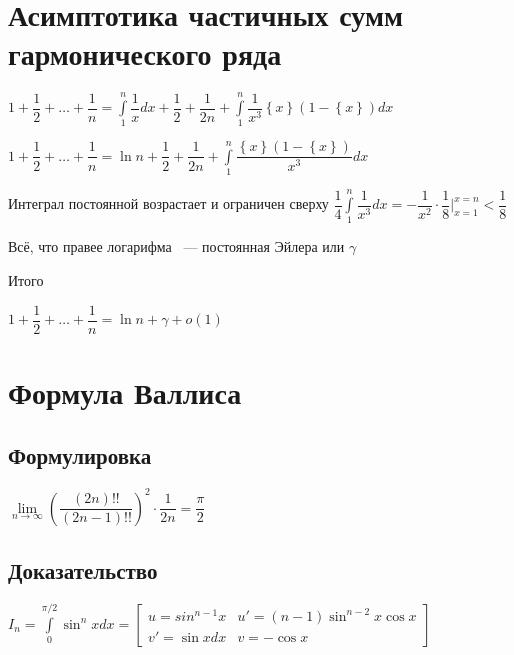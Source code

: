 \documentclass{article}
\begin{document}
    \newpage
    
    \section{Асимптотика частичных сумм гармонического ряда}
    
        $1 + \dfrac{1}{2} + \ldots + \dfrac{1}{n} = \int\limits^n_1 \dfrac{1}{x} dx + \dfrac{1}{2} + \dfrac{1}{2n} + \int\limits^n_1 \dfrac{1}{x^3} \left\{ x \right\}(1 - \left\{ x \right\}) dx$
        
        $1 + \dfrac{1}{2} + \ldots + \dfrac{1}{n} = \ln n + \dfrac{1}{2} + \dfrac{1}{2n} + \int\limits^n_1 \dfrac{\left\{ x \right\}(1 - \left\{ x \right\})}{x^3} dx$
        
        Интеграл постоянной возрастает и ограничен сверху $\dfrac{1}{4} \int\limits^n_1 \dfrac{1}{x^3} dx = -\dfrac{1}{x^2} \cdot \dfrac{1}{8} \bigg|^{x = n}_{x = 1} < \dfrac{1}{8}$
        
        Всё, что правее логарифма ~--- постоянная Эйлера или $\gamma$
        
        Итого
        
        $1 + \dfrac{1}{2} + \ldots + \dfrac{1}{n} = \ln {n} + \gamma + o(1)$
        
    \newpage
    
    \section{Формула Валлиса}
    
        \subsection{Формулировка}
        
            $\lim\limits_{n \rightarrow \infty} \left( \dfrac{(2n)!!}{(2n - 1)!!} \right)^2 \cdot \dfrac{1}{2n} = \dfrac{\pi}{2}$
            
        \subsection{Доказательство}
        
            $I_n = \int\limits^{\pi / 2}_0 \sin^n x dx = \begin{bmatrix} u = sin^{n - 1} x & u' = (n - 1) \sin^{n - 2} x \cos x \\ v' = \sin {x} dx & v = -\cos{x} \end{bmatrix}$
            
\end{document}
